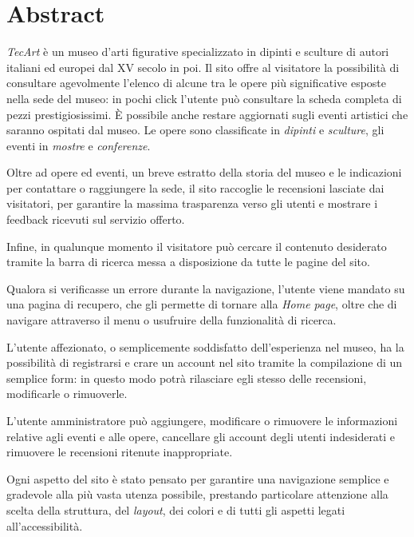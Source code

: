 \section{Abstract}
\label{abstract}
\textit{TecArt} è un museo d'arti figurative specializzato in dipinti e sculture di autori italiani ed europei dal XV secolo in poi. Il sito offre al visitatore la possibilità di consultare agevolmente l'elenco di alcune tra le opere più significative esposte nella sede del museo: in pochi click l'utente può consultare la scheda completa di pezzi prestigiosissimi. È possibile anche restare aggiornati sugli eventi artistici che saranno ospitati dal museo. Le opere sono classificate in \textit{dipinti} e \textit{sculture}, gli eventi in \textit{mostre} e \textit{conferenze}.

Oltre ad opere ed eventi, un breve estratto della storia del museo e le indicazioni per contattare o raggiungere la sede, il sito raccoglie le recensioni lasciate dai visitatori, per garantire la massima trasparenza verso gli utenti e mostrare i feedback ricevuti sul servizio offerto.

Infine, in qualunque momento il visitatore può cercare il contenuto desiderato tramite la barra di ricerca messa a disposizione da tutte le pagine del sito.

Qualora si verificasse un errore durante la navigazione, l'utente viene mandato su una pagina di recupero, che gli permette di tornare alla \textit{Home page}, oltre che di navigare attraverso il menu o usufruire della funzionalità di ricerca.

L'utente affezionato, o semplicemente soddisfatto dell'esperienza nel museo, ha la possibilità di registrarsi e crare un account nel sito tramite la compilazione di un semplice form: in questo modo potrà rilasciare egli stesso delle recensioni, modificarle o rimuoverle.

L'utente amministratore può aggiungere, modificare o rimuovere le informazioni relative agli eventi e alle opere, cancellare gli account degli utenti indesiderati e rimuovere le recensioni ritenute inappropriate.

Ogni aspetto del sito è stato pensato per garantire una navigazione semplice e gradevole alla più vasta utenza possibile, prestando particolare attenzione alla scelta della struttura, del \textit{layout}, dei colori e di tutti gli aspetti legati all'accessibilità.